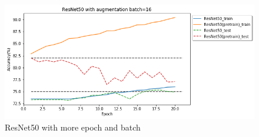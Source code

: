 \documentclass[12pt]{article}
\begin{document}
\begin{figure}[H]
\centering
\includegraphics[width=\linewidth]{Images/ResNet50withLE.png}
\caption{ResNet50 with more epoch and batch}
\end{figure}

 
\end{document}
